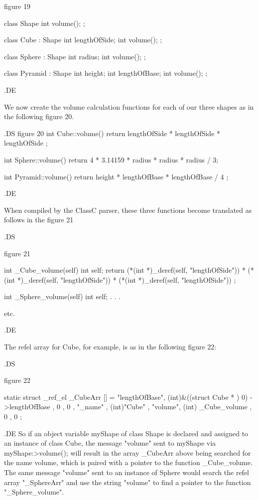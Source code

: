 figure 19

class Shape
    {
	int volume();
    }	;


class Cube : Shape
    {
	int	lengthOfSide;
	int	volume();
    }	;

class Sphere : Shape
    {
	int	radius;
	int	volume();
    }	;

class Pyramid : Shape
    {
	int	height;
	int	lengthOfBase;
	int	volume();
    }	;



.DE

We now create the volume calculation functions for each of our
three shapes as in the following figure 20.

.DS
figure 20
int Cube::volume()
{ return lengthOfSide * lengthOfSide * lengthOfSide ; }

int Sphere::volume()
{ return 4 * 3.14159 * radius * radius * radius / 3; }

int Pyramid::volume()
{ return height * lengthOfBase * lengthOfBase / 4 ; }


.DE

When compiled by the ClassC parser, these three functions become
translated as follows in the figure 21

.DS

figure 21


int _Cube_volume(self)  int self;
{ return (*(int  *)_deref(self, "lengthOfSide")) *
         (*(int  *)_deref(self, "lengthOfSide")) *
         (*(int  *)_deref(self, "lengthOfSide")) ;
}

int _Sphere_volume(self)	int self;
{
	.
	.
	.
}

etc.


.DE

The refel array for Cube, for example, is as in the following figure 22:

.DS

figure 22

static struct _ref_el _CubeArr [] =
    { 
	{ "lengthOfBase",	(int)&((struct Cube * ) 0) ->lengthOfBase },
	{ 0 , 0 },
	{ "_name" , (int)"Cube" },
	{ "volume",	(int) _Cube_volume },
	{  0 , 0 }
    };	


.DE
So if an object variable myShape of class Shape is declared and assigned
to an instance of class Cube, the message "volume" sent to myShape
via myShape:>volume(); will result in the array _CubeArr above being
searched for the name volume, which is paired with a pointer to the 
function _Cube_volume.  The same message "volume" sent to an instance
of Sphere would search the refel array "_SphereArr" and use the 
string "volume" to find a pointer to the function "_Sphere_volume".

